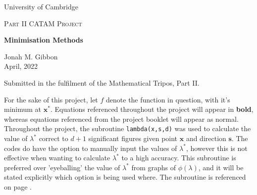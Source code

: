 \documentclass[10pt,a4paper,notitlepage]{article}
\newcommand{\x}{\mathbf{x}}
\newcommand{\s}{\mathbf{s}}
\begin{document}
\begin{titlepage}
	\centering
	\vspace*{5cm}
	{\large{University of Cambridge} \par}
	\vspace{1cm}
	{\Large \textsc{Part II CATAM Project}\par}
	\vspace{1.5cm}
	{\huge\bfseries Minimisation Methods\par}
	\vspace{2cm}
	{\Large Jonah M. Gibbon\\ \vspace{0.6cm} April, 2022}
	\vfill
	


	{Submitted in the fulfilment of the Mathematical Tripos, Part II.}
\end{titlepage}
For the sake of this project, let $f$ denote the function in question, with it's minimum at $\x^{*}$. Equations referenced throughout the project will appear in \textbf{bold}, whereas equations referenced from the project booklet will appear as normal. \\

Throughout the project, the subroutine \texttt{lambda(x,s,d)} was used to calculate the value of $\lambda^{*}$ correct to $d+1$ significant figures given point $\x$ and direction $\s$. The codes do have the option to manually input the values of $\lambda^{*}$, however this is not effective when wanting to calculate $\lambda^{*}$ to a high accuracy. This subroutine is preferred over 'eyeballing' the value of $\lambda^{*}$ from graphs of $\phi(\lambda)$, and it will be stated explicitly which option is being used where. The subroutine is referenced on page \pageref{cd:0}.
\end{document}
